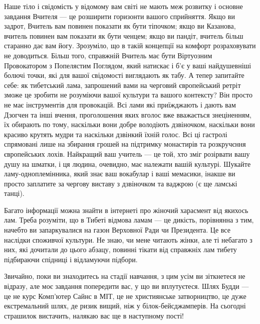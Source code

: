 Наше тіло і свідомість у відомому вам світі не мають меж розвитку
і основне завдання Вчителя --- це розширити горизонти вашого сприйняття.
Якщо ви задрот, Вчитель вам повинен показати як бути тіпочком; якщо ви Казанова,
вчитель повинен вам показати як бути ченцем; якщо ви пандіт, вчитель більш
старанно дає вам йогу. Зрозуміло, що в такій концепції на комфорт розраховувати
не доводиться. Більш того, справжній Вчитель має бути Віртуозним Провокатором
з Попелястим Поглядом, який натискає і б'є у ваші найдушевніші болючі точки,
які для вашої свідомості виглядають як табу. А тепер запитайте себе:
як тибетський лама, запрошений вами на черговий європейський ретріт
зможе це зробити не розуміючи вашої культури та вашого контексту? Він
просто не має інструментів для провокацій. Всі лами які приїжджають і
дають вам Дзогчен та інші вчення, проголошення яких вголос вже вважається
знеціненням, їх обирають по тому, наскільки вони добре володіють дзвіночком,
наскільки вони красиво крутять мудри та наскільки дзвінкий їхній голос.
Всі ці гастролі спрямовані лише на збирання грошей на підтримку монастирів
та розкручєння європейських лохів. Найкращий ваш учитель --- це той,
хто зміг розірвати вашу душу на шматки, і ця людина, очевидно,
має належати вашій культурі. Шукайте ламу-одноплемінника, який
знає ваш вокабулар і ваші мемасики, інакше ви просто заплатите
за чергову виставу з дзвіночком та ваджрою (є ще ламські танці).

Багато інформації можна знайти в інтернеті про жіночий харасмент
від якихось лам. Треба розуміти, що в Тибеті відмова ламам --- це дикість,
порівнянна з тим, начебто ви запаркувалися на газон Верховної Ради чи Президента.
Це все наслідки споживчої культури. Не знаю, чи мене читають жінки,
але ті небагато з них, які дочитали до цього абзацу, повинні тікати
від справжніх лам тибету підбираючи спідниці і відламуючи підбори.

Звичайно, поки ви знаходитесь на стадії навчання, з цим усім ви
зіткнетеся не відразу, але моє завдання попередити вас, у що ви вплутуєтеся.
Шлях Будди --- це не курс Комп'ютер Сайнс в МІТ, це не християнське
затворництво, це дуже екстремальний шлях, де ризик вищий,
ніж у білок-бейсджамперів. На сьогодні страшилок вистачить,
налякаю вас ще в наступному пості!
